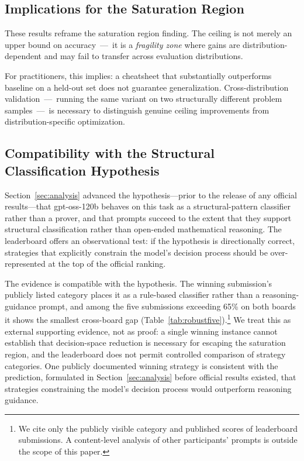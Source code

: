 \documentclass[11pt]{article}
\begin{document}
\subsection{Implications for the Saturation Region}

These results reframe the saturation region finding. The ceiling is not
merely an upper bound on accuracy~---~it is a \emph{fragility zone}
where gains are distribution-dependent and may fail to transfer across
evaluation distributions.

For practitioners, this implies: a cheatsheet that substantially
outperforms baseline on a held-out set does not guarantee
generalization. Cross-distribution validation~---~running the same
variant on two structurally different problem samples~---~is necessary
to distinguish genuine ceiling improvements from distribution-specific
optimization.

\subsection{Compatibility with the Structural Classification Hypothesis}
\label{sec:official-router}

Section~\ref{sec:analysis} advanced the hypothesis---prior to the
release of any official results---that gpt-oss-120b behaves on this
task as a structural-pattern classifier rather than a prover, and that
prompts succeed to the extent that they support structural
classification rather than open-ended mathematical reasoning. The
leaderboard offers an observational test: if the hypothesis is
directionally correct, strategies that explicitly constrain the model's
decision process should be over-represented at the top of the official
ranking.

The evidence is compatible with the hypothesis. The winning
submission's publicly listed category places it as a rule-based
classifier rather than a reasoning-guidance prompt, and among the
five submissions exceeding 65\% on both boards it shows the smallest
cross-board gap (Table~\ref{tab:robustfive}).\footnote{We cite only
the publicly visible category and published scores of leaderboard
submissions. A content-level analysis of other participants' prompts
is outside the scope of this paper.} We treat this as external
supporting evidence, not as proof: a single winning instance cannot
establish that decision-space reduction is necessary for escaping the
saturation region, and the leaderboard does not permit controlled
comparison of strategy categories. One publicly documented winning
strategy is consistent with the prediction, formulated in
Section~\ref{sec:analysis} before official results existed, that
strategies constraining the model's decision process would outperform
reasoning guidance.
\end{document}
